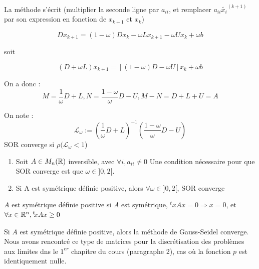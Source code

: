 La méthode s'écrit (multiplier la seconde ligne par $a_{ii}$, et remplacer $a_{ii}\tilde{x_i}^{(k+1)}$ par son expression en fonction de $x_{k+1}$ et $x_k$)

\[
    Dx_{k+1}=(1-\omega)Dx_k - \omega L x_{k+1} - \omega U x_k + \omega b
\]

soit

\[
    (D + \omega L)x_{k+1} = [(1-\omega)D - \omega U]x_k + \omega b
\]

On a donc : 
\[
    M = \frac{1}{\omega}D + L, N = \frac{1-\omega}{\omega}D - U, M-N=D+L+U=A
\]

On note :
\[
    \mathcal{L}_{\omega} := (\frac{1}{\omega}D + L)^{-1}(\frac{1-\omega}{\omega}D - U)
\]
SOR converge si $\rho(\mathcal{L}_{\omega}<1$)

\begin{ftheo}[demo en TD]
    \begin{enumerate}
        \item
            Soit $A \in M_n(\mathbb{R})$ inversible, avec $\forall i, a_{ii} \ne 0$
            Une condition nécessaire pour que SOR converge est que $\omega \in ]0,2[$.

        \item
            Si A est symétrique définie positive, alors $\forall \omega \in ]0,2[$, SOR converge 
    \end{enumerate}
\end{ftheo}

\begin{rappel}
    $A$ est symétrique définie positive si $A$ est symétrique, $^txAx = 0 \Rightarrow x = 0$, et $\forall x \in \mathbb{R}^n, {}^t\!xAx \geq 0$
\end{rappel}

\begin{coroll}
    Si $A$ est symétrique définie positive, alors la méthode de Gauss-Seidel converge.
    Nous avons rencontré ce type de matrices pour la discrétisation des problèmes aux limites dns le $1^{er}$ chapitre du cours (paragraphe 2), cas où la fonction $p$ est identiquement nulle.
\end{coroll}

